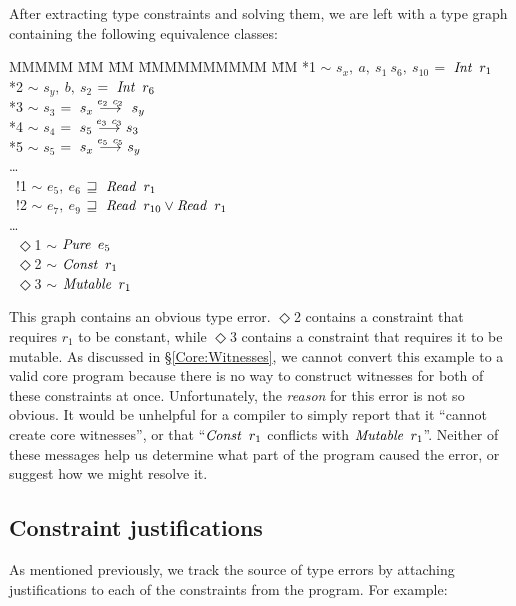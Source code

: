 After extracting type constraints and solving them, we are left with a type graph containing the following equivalence classes:

\vspace{-1ex}
\begin{tabbing}
MMMMM	\= MM 	\= MM 		\= MMMMMMMMMM 		\= MM \kill
	\> *1	\> $\sim$	\> $s_x, \ a, \ s_1 \ s_6, \ s_{10}$		
				\> $= \ \operatorname{\mathit{Int}} \ r_1$ 
	\\
	\> *2	\> $\sim$	\> $s_y, \ b, \ s_2$	
				\> $= \ \operatorname{\mathit{Int}}  \ r_6$ 
	\\
	\> *3	\> $\sim$	\> $s_3$		
				\> $= \ s_x \stackrel{e_2 \ c_2}{\longrightarrow} \ s_y$ 
	\\
	\> *4	\> $\sim$	\> $s_4$
				\> $= \ s_5 \stackrel{e_3 \ c_3}{\longrightarrow} s_3$ 
	\\
	\> *5	\> $\sim$	\> $s_5$
				\> $= \ s_x \stackrel{e_5 \ c_5}{\longrightarrow} s_y$\\
	\> \qq \dots \\
	\> \ !1	\> $\sim$	\> $e_5, \ e_6$
				\> $\sqsupseteq \ \operatorname{\mathit{Read}} \ r_1$ 
	\\
	\> \ !2 \> $\sim$	\> $e_7, \ e_9$
				\> $\tme \ \iRead \ r_{10} \lor \iRead \ r_1$
	\\
	\> \qq \dots \\
	\> \ $\Diamond$1 \> $\sim$ \> $\operatorname{\mathit{Pure}} \ e_5$ \\
	\> \ $\Diamond$2 \> $\sim$ \> $\iConst \ r_1$ \\
	\> \ $\Diamond$3 \> $\sim$ \> $\iMutable \ r_1$
\end{tabbing}

This graph contains an obvious type error. $\Diamond$2 contains a constraint that requires $r_1$ to be constant, while $\Diamond$3 contains a constraint that requires it to be mutable. As discussed in \S\ref{Core:Witnesses}, we cannot convert this example to a valid core program because there is no way to construct witnesses for both of these constraints at once. Unfortunately, the \emph{reason} for this error is not so obvious. It would be unhelpful for a compiler to simply report that it ``cannot create core witnesses'', or that ``$\iConst \ r_1$ conflicts with $\iMutable \ r_1$''. Neither of these messages help us determine what part of the program caused the error, or suggest how we might resolve it.

\subsection{Constraint justifications}

As mentioned previously, we track the source of type errors by attaching justifications to each of the constraints from the program. For example:

